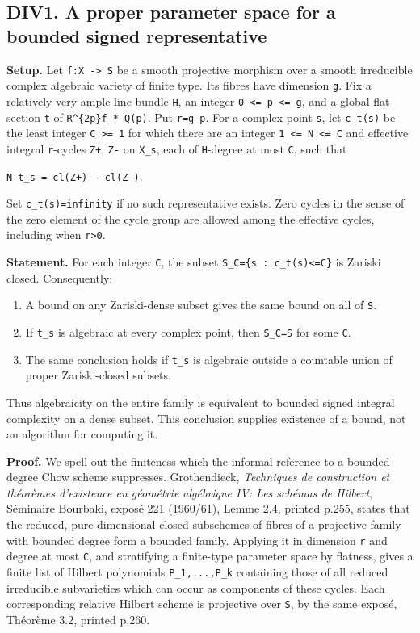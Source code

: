 \documentclass[11pt,a4paper]{article}
\providecommand{\tightlist}{\setlength{\itemsep}{0pt}\setlength{\parskip}{0pt}}
\theoremstyle{definition}
\begin{document}
\subsection{DIV1. A proper parameter space for a bounded signed
representative}\label{div1.-a-proper-parameter-space-for-a-bounded-signed-representative}

\textbf{Setup.} Let \texttt{f:X\ -\textgreater{}\ S} be a smooth
projective morphism over a smooth irreducible complex algebraic variety
of finite type. Its fibres have dimension \texttt{g}. Fix a relatively
very ample line bundle \texttt{H}, an integer
\texttt{0\ \textless{}=\ p\ \textless{}=\ g}, and a global flat section
\texttt{t} of \texttt{R\^{}\{2p\}f\_*\ Q(p)}. Put \texttt{r=g-p}. For a
complex point \texttt{s}, let \texttt{c\_t(s)} be the least integer
\texttt{C\ \textgreater{}=\ 1} for which there are an integer
\texttt{1\ \textless{}=\ N\ \textless{}=\ C} and effective integral
\texttt{r}-cycles \texttt{Z+}, \texttt{Z-} on \texttt{X\_s}, each of
\texttt{H}-degree at most \texttt{C}, such that

\texttt{N\ t\_s\ =\ cl(Z+)\ -\ cl(Z-)}.

Set \texttt{c\_t(s)=infinity} if no such representative exists. Zero
cycles in the sense of the zero element of the cycle group are allowed
among the effective cycles, including when \texttt{r\textgreater{}0}.

\textbf{Statement.} For each integer \texttt{C}, the subset
\texttt{S\_C=\{s\ :\ c\_t(s)\textless{}=C\}} is Zariski closed.
Consequently:

\begin{enumerate}
\def\labelenumi{\arabic{enumi}.}
\tightlist
\item
  A bound on any Zariski-dense subset gives the same bound on all of
  \texttt{S}.
\item
  If \texttt{t\_s} is algebraic at every complex point, then
  \texttt{S\_C=S} for some \texttt{C}.
\item
  The same conclusion holds if \texttt{t\_s} is algebraic outside a
  countable union of proper Zariski-closed subsets.
\end{enumerate}

Thus algebraicity on the entire family is equivalent to bounded signed
integral complexity on a dense subset. This conclusion supplies
existence of a bound, not an algorithm for computing it.

\textbf{Proof.} We spell out the finiteness which the informal reference
to a bounded-degree Chow scheme suppresses. Grothendieck,
\emph{Techniques de construction et théorèmes d'existence en géométrie
algébrique IV: Les schémas de Hilbert}, Séminaire Bourbaki, exposé 221
(1960/61), Lemme 2.4, printed p.255, states that the reduced,
pure-dimensional closed subschemes of fibres of a projective family with
bounded degree form a bounded family. Applying it in dimension
\texttt{r} and degree at most \texttt{C}, and stratifying a finite-type
parameter space by flatness, gives a finite list of Hilbert polynomials
\texttt{P\_1,...,P\_k} containing those of all reduced irreducible
subvarieties which can occur as components of these cycles. Each
corresponding relative Hilbert scheme is projective over \texttt{S}, by
the same exposé, Théorème 3.2, printed p.260.
\end{document}
